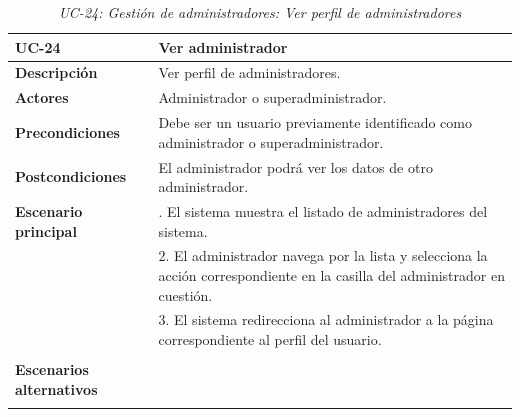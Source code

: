 \begin{table}
  \begin{center}
    \begin{tabularx}{16.4cm}{|l|X|}
      \hline
      \textbf{UC-24} & \textbf{Ver administrador}\\
      \hline
      \textbf{Descripción} & Ver perfil de administradores. \\
      \hline
      \textbf{Actores} & Administrador o superadministrador.\\
      \hline
      \textbf{Precondiciones} & Debe ser un usuario previamente identificado como administrador o superadministrador.\\
      \hline
      \textbf{Postcondiciones} & El administrador podrá ver los datos de otro administrador.\\
      \hline
      \textbf{Escenario principal} & \smallskip 1. El sistema muestra el listado de administradores del sistema.\\
      & 2. El administrador navega por la lista y selecciona la acción correspondiente en la casilla del administrador en cuestión.\\
      & 3. El sistema redirecciona al administrador a la página correspondiente al perfil del usuario.\\
      & \\
      \hline
      \textbf{Escenarios alternativos} & \\
      & \\
      \hline
    \end{tabularx}
    \caption{\textit{UC-24: Gestión de administradores: Ver perfil de administradores}}
    \label{tab:CU-ver-perfil-de-admin}
  \end{center}
\end{table}


